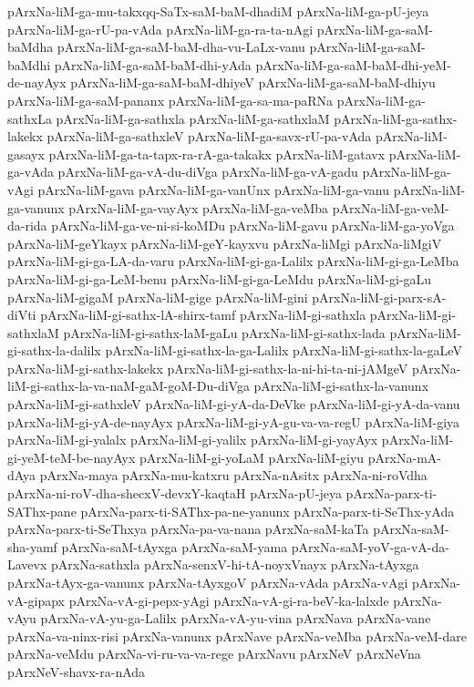 {pArxNa-liM-ga-mu-takxqq-SaTx-saM-baM-dhadiM
pArxNa-liM-ga-pU-jeya
pArxNa-liM-ga-rU-pa-vAda
pArxNa-liM-ga-ra-ta-nAgi
pArxNa-liM-ga-saM-baMdha
pArxNa-liM-ga-saM-baM-dha-vu-LaLx-vanu
pArxNa-liM-ga-saM-baMdhi
pArxNa-liM-ga-saM-baM-dhi-yAda
pArxNa-liM-ga-saM-baM-dhi-yeM-de-nayAyx
pArxNa-liM-ga-saM-baM-dhiyeV
pArxNa-liM-ga-saM-baM-dhiyu
pArxNa-liM-ga-saM-pananx
pArxNa-liM-ga-sa-ma-paRNa
pArxNa-liM-ga-sathxLa
pArxNa-liM-ga-sathxla
pArxNa-liM-ga-sathxlaM
pArxNa-liM-ga-sathx-lakekx
pArxNa-liM-ga-sathxleV
pArxNa-liM-ga-savx-rU-pa-vAda
pArxNa-liM-gasayx
pArxNa-liM-ga-ta-tapx-ra-rA-ga-takakx
pArxNa-liM-gatavx
pArxNa-liM-ga-vAda
pArxNa-liM-ga-vA-du-diVga
pArxNa-liM-ga-vA-gadu
pArxNa-liM-ga-vAgi
pArxNa-liM-gava
pArxNa-liM-ga-vanUnx
pArxNa-liM-ga-vanu
pArxNa-liM-ga-vanunx
pArxNa-liM-ga-vayAyx
pArxNa-liM-ga-veMba
pArxNa-liM-ga-veM-da-rida
pArxNa-liM-ga-ve-ni-si-koMDu
pArxNa-liM-gavu
pArxNa-liM-ga-yoVga
pArxNa-liM-geYkayx
pArxNa-liM-geY-kayxvu
pArxNa-liMgi
pArxNa-liMgiV
pArxNa-liM-gi-ga-LA-da-varu
pArxNa-liM-gi-ga-Lalilx
pArxNa-liM-gi-ga-LeMba
pArxNa-liM-gi-ga-LeM-benu
pArxNa-liM-gi-ga-LeMdu
pArxNa-liM-gi-gaLu
pArxNa-liM-gigaM
pArxNa-liM-gige
pArxNa-liM-gini
pArxNa-liM-gi-parx-sA-diVti
pArxNa-liM-gi-sathx-lA-shirx-tamf
pArxNa-liM-gi-sathxla
pArxNa-liM-gi-sathxlaM
pArxNa-liM-gi-sathx-laM-gaLu
pArxNa-liM-gi-sathx-lada
pArxNa-liM-gi-sathx-la-dalilx
pArxNa-liM-gi-sathx-la-ga-Lalilx
pArxNa-liM-gi-sathx-la-gaLeV
pArxNa-liM-gi-sathx-lakekx
pArxNa-liM-gi-sathx-la-ni-hi-ta-ni-jAMgeV
pArxNa-liM-gi-sathx-la-va-naM-gaM-goM-Du-diVga
pArxNa-liM-gi-sathx-la-vanunx
pArxNa-liM-gi-sathxleV
pArxNa-liM-gi-yA-da-DeVke
pArxNa-liM-gi-yA-da-vanu
pArxNa-liM-gi-yA-de-nayAyx
pArxNa-liM-gi-yA-gu-va-va-regU
pArxNa-liM-giya
pArxNa-liM-gi-yalalx
pArxNa-liM-gi-yalilx
pArxNa-liM-gi-yayAyx
pArxNa-liM-gi-yeM-teM-be-nayAyx
pArxNa-liM-gi-yoLaM
pArxNa-liM-giyu
pArxNa-mA-dAya
pArxNa-maya
pArxNa-mu-katxru
pArxNa-nAsitx
pArxNa-ni-roVdha
pArxNa-ni-roV-dha-shecxV-devxY-kaqtaH
pArxNa-pU-jeya
pArxNa-parx-ti-SAThx-pane
pArxNa-parx-ti-SAThx-pa-ne-yanunx
pArxNa-parx-ti-SeThx-yAda
pArxNa-parx-ti-SeThxya
pArxNa-pa-va-nana
pArxNa-saM-kaTa
pArxNa-saM-sha-yamf
pArxNa-saM-tAyxga
pArxNa-saM-yama
pArxNa-saM-yoV-ga-vA-da-Lavevx
pArxNa-sathxla
pArxNa-senxV-hi-tA-noyxVnayx
pArxNa-tAyxga
pArxNa-tAyx-ga-vanunx
pArxNa-tAyxgoV
pArxNa-vAda
pArxNa-vAgi
pArxNa-vA-gipapx
pArxNa-vA-gi-pepx-yAgi
pArxNa-vA-gi-ra-beV-ka-lalxde
pArxNa-vAyu
pArxNa-vA-yu-ga-Lalilx
pArxNa-vA-yu-vina
pArxNava
pArxNa-vane
pArxNa-va-ninx-risi
pArxNa-vanunx
pArxNave
pArxNa-veMba
pArxNa-veM-dare
pArxNa-veMdu
pArxNa-vi-ru-va-va-rege
pArxNavu
pArxNeV
pArxNeVna
pArxNeV-shavx-ra-nAda
}
